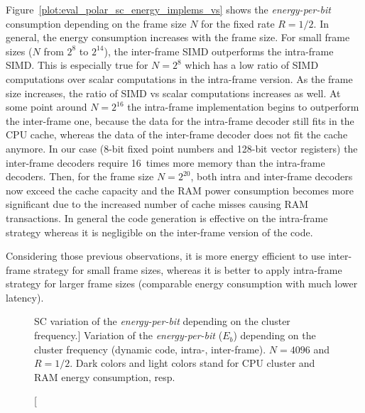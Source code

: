 Figure~\ref{plot:eval_polar_sc_energy_implems_vs} shows the
\emph{energy-per-bit} consumption depending on the frame size $N$ for the fixed
rate $R = 1/2$. In general, the energy consumption increases with the frame
size. For small frame sizes ($N$ from $2^{8}$ to $2^{14}$), the inter-frame SIMD
outperforms the intra-frame SIMD. This is especially true for $N = 2^8$ which
has a low ratio of SIMD computations over scalar computations in the intra-frame
version. As the frame size increases, the ratio of SIMD vs scalar computations
increases as well. At some point around $N = 2^{16}$ the intra-frame
implementation begins to outperform the inter-frame one, because the data for
the intra-frame decoder still fits in the CPU cache, whereas the data of the
inter-frame decoder does not fit the cache anymore. In our case (8-bit fixed
point numbers and 128-bit vector registers) the inter-frame decoders require
16~times more memory than the intra-frame decoders. Then, for the frame size
$N = 2^{20}$, both intra and inter-frame decoders now exceed the cache capacity
and the RAM power consumption becomes more significant due to the increased
number of cache misses causing RAM transactions. In general the code generation
is effective on the intra-frame strategy whereas it is negligible on the
inter-frame version of the code.

Considering those previous observations, it is more energy efficient to use
inter-frame strategy for small frame sizes, whereas it is better to apply
intra-frame strategy for larger frame sizes (comparable energy consumption with
much lower latency).

\begin{figure}[htp]
  \centering
  \quad
  \caption
    [SC variation of the \emph{energy-per-bit} depending on the cluster
    frequency.]
    {Variation of the \emph{energy-per-bit} ($E_b$) depending on the cluster
    frequency (dynamic code, intra-, inter-frame). $N = 4096$ and $R = 1/2$.
    Dark colors and light colors stand for CPU cluster and RAM energy
    consumption, resp.}
  \label{plot:eval_polar_sc_energy_freq}
\end{figure}

